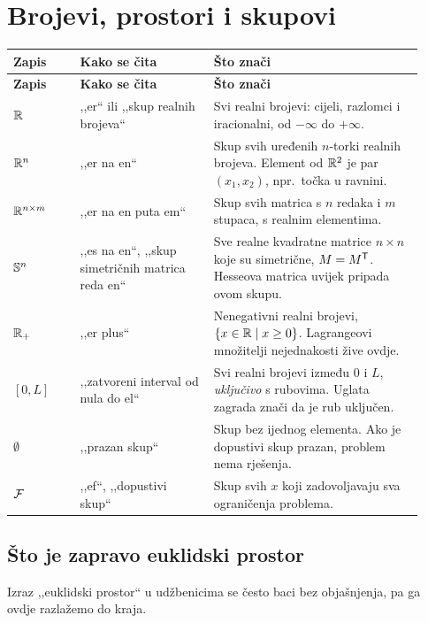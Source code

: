 \section{Brojevi, prostori i skupovi}
\label{sec:prostori}

\begin{longtable}{@{}p{0.15\linewidth} p{0.30\linewidth} p{0.47\linewidth}@{}}
\toprule
\textbf{Zapis} & \textbf{Kako se čita} & \textbf{Što znači} \\
\midrule
\endfirsthead
\toprule
\textbf{Zapis} & \textbf{Kako se čita} & \textbf{Što znači} \\
\midrule
\endhead
$\mathbb{R}$ & ,,er`` ili ,,skup realnih brojeva`` & Svi realni brojevi: cijeli, razlomci i iracionalni, od $-\infty$ do $+\infty$. \\[4pt]
$\mathbb{R}^n$ & ,,er na en`` & Skup svih uređenih $n$-torki realnih brojeva. Element od $\mathbb{R}^2$ je par $(x_1, x_2)$, npr.\ točka u ravnini. \\[4pt]
$\mathbb{R}^{n \times m}$ & ,,er na en puta em`` & Skup svih matrica s $n$ redaka i $m$ stupaca, s realnim elementima. \\[4pt]
$\mathbb{S}^{n}$ & ,,es na en``, ,,skup simetričnih matrica reda en`` & Sve realne kvadratne matrice $n \times n$ koje su simetrične, $M = M^{\mathsf{T}}$. Hesseova matrica uvijek pripada ovom skupu. \\[4pt]
$\mathbb{R}_{+}$ & ,,er plus`` & Nenegativni realni brojevi, $\{x \in \mathbb{R} \mid x \geq 0\}$. Lagrangeovi množitelji nejednakosti žive ovdje. \\[4pt]
$[0, L]$ & ,,zatvoreni interval od nula do el`` & Svi realni brojevi između $0$ i $L$, \emph{uključivo} s rubovima. Uglata zagrada znači da je rub uključen. \\[4pt]
$\emptyset$ & ,,prazan skup`` & Skup bez ijednog elementa. Ako je dopustivi skup prazan, problem nema rješenja. \\[4pt]
$\mathcal{F}$ & ,,ef``, ,,dopustivi skup`` & Skup svih $x$ koji zadovoljavaju sva ograničenja problema. \\
\bottomrule
\end{longtable}

\subsection{Što je zapravo euklidski prostor}
\label{sec:euklidski}

Izraz ,,euklidski prostor`` u udžbenicima se često baci bez objašnjenja, pa ga
ovdje razlažemo do kraja.

